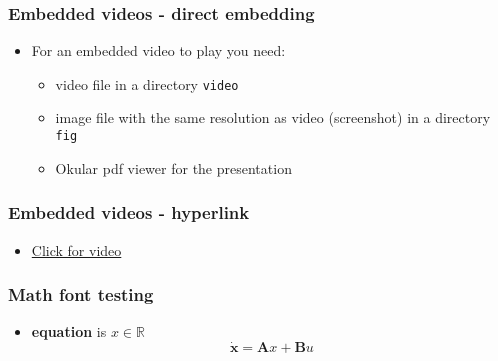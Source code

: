 \begin{frame}
   \frametitle{Embedded videos - direct embedding}
   \begin{itemize} \justifying %
      \item For an embedded video to play you need:
	 \begin{itemize}
	    \item video file in a directory \texttt{video}
	    \item image file with the same resolution as video (screenshot) in a directory \texttt{fig}
	    \item Okular pdf viewer for the presentation
	 \end{itemize}
   \end{itemize}

   \begin{center}
   \end{center}
\end{frame}

\begin{frame}
   \frametitle{Embedded videos - hyperlink}
   \begin{itemize} \justifying %
      \item \href{run:./videos/gait_sm.mp4}{Click for video}
   \end{itemize}
\end{frame}

\begin{frame}
   \frametitle{Math font testing}
   \begin{itemize} \justifying %
     \item {\bf equation} is $x \in \mathbb{R}$
      \begin{equation}
        \dot{\mathbf{x}} = \mathbf{A}x + \mathbf{B}u
      \end{equation}
   \end{itemize}
\end{frame}

